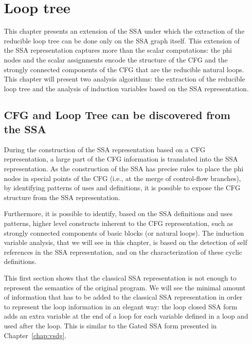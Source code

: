 \chapter{Loop tree }
\graphicspath{{fig/}{loop_tree/fig/}{part3/loop_tree/fig/}}


\providecommand{\SSA}{SSA}
\providecommand{\CFG}{CFG}
\providecommand{\loopphi}{loop-$\phi$}
\providecommand{\closephi}{close-$\phi$}
\providecommand{\CHREC}[1]{\{#1\}}

This chapter presents an extension of the \SSA{} under which the
extraction of the reducible loop tree can be done only on the \SSA{}
graph itself.  This extension of the \SSA{} representation captures
more than the scalar computations: the phi nodes and the scalar
assignments encode the structure of the CFG and the strongly connected
components of the CFG that are the reducible natural loops.  This
chapter will present two analysis algorithms: the extraction of the
reducible loop tree and the analysis of induction variables based on
the \SSA{} representation.

\section{\CFG{} and Loop Tree can be discovered from the \SSA{}}

During the construction of the \SSA{} representation based on a \CFG{}
representation, a large part of the \CFG{} information is translated
into the \SSA{} representation.  As the construction of the \SSA{} has
precise rules to place the phi nodes in special points of the \CFG{}
(i.e., at the merge of control-flow branches), by identifying patterns
of uses and definitions, it is possible to expose the \CFG{} structure
from the \SSA{} representation.

Furthermore, it is possible to identify, based on the \SSA{}
definitions and uses patterns, higher level constructs inherent to the
\CFG{} representation, such as strongly connected components of basic
blocks (or natural loops).  The induction variable analysis, that we
will see in this chapter, is based on the detection of self references
in the \SSA{} representation, and on the characterization of these
cyclic definitions.

This first section shows that the classical \SSA{} representation is
not enough to represent the semantics of the original program.  We
will see the minimal amount of information that has to be added to the
classical \SSA{} representation in order to represent the loop
information in an elegant way: the loop closed \SSA{} form adds an
extra variable at the end of a loop for each variable defined in a
loop and used after the loop.  This is similar to the Gated \SSA{}
form presented in Chapter~\ref{chap:vsdg}.

